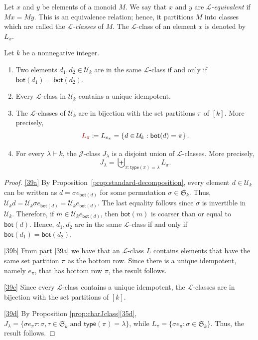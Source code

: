 \documentclass[ALCO,Unicode]{cedram}
\newcommand{\defncolor}{\color{darkred}}
\newcommand{\defn}[1]{{\defncolor\emph{#1}}} %
\begin{document}
Let $x$ and $y$ be elements of a monoid $M$.  We say that $x$ and $y$ are \defn{$\mathscr{L}$-equivalent} if $Mx = My$.
This is an equivalence relation; hence, it partitions $M$ into classes which are called the \defn{$\mathscr{L}$-classes} of $M$.
The $\mathscr{L}$-class of an element $x$ is denoted by \defn{$L_x$}.

\begin{prop} Let $k$ be a nonnegative integer.
\begin{enumerate}[label=(\alph*)]
    \item\label{39a} Two elements $d_1,d_2\in \mathcal{U}_k$ are in the same $\mathscr{L}$-class if and only if $\mathsf{bot}(d_1) = \mathsf{bot}(d_2)$.
    \item\label{39b} Every $\mathscr{L}$-class in $\mathcal{U}_k$ contains a unique idempotent.
    \item\label{39c} The $\mathscr{L}$-classes of $\mathcal{U}_k$ are in bijection with the set partitions $\pi$ of $[k]$. More precisely,
    $${\defncolor L_\pi} \coloneqq L_{e_\pi} = \left\{ d \in \mathcal{U}_k : \mathsf{bot}(d) = \pi\right\}.$$
    \item\label{39d} For every $\lambda \vdash k$, the $\mathscr{J}$-class $J_\lambda$
        is a disjoint union of $\mathscr{L}$-classes.
        More precisely, $$J_\lambda = \biguplus_{\pi: \mathsf{type}(\pi) = \lambda} L_\pi.$$
\end{enumerate}
\end{prop}

\begin{proof}
\ref{39a} By Proposition~\ref{prop:standard-decomposition}, every element $d \in \mathcal{U}_k$ can be written as
$d = \sigma e_{\mathsf{bot}(d)}$ for some permutation $\sigma \in \mathfrak{S}_k$. Thus,
$\mathcal{U}_k d = \mathcal{U}_k \sigma e_{\mathsf{bot}(d)} = \mathcal{U}_k e_{\mathsf{bot}(d)}$. The last equality follows since $\sigma$
is invertible in $\mathcal{U}_k$. Therefore, if $m \in \mathcal{U}_k e_{\mathsf{bot}(d)}$, then $\mathsf{bot}(m)$ is coarser than or equal to
$\mathsf{bot}(d)$. Hence, $d_1,d_2$ are in the same $\mathscr{L}$-class if and only if $\mathsf{bot}(d_1)= \mathsf{bot}(d_2)$.

\ref{39b} From part \ref{39a} we have that an $\mathscr{L}$-class $L$ contains elements that have the same set partition $\pi$ as the bottom row. Since there is a
unique idempotent, namely $e_\pi$, that has bottom row $\pi$, the result follows.

\ref{39c} Since every $\mathscr{L}$-class contains a unique idempotent, the $\mathscr{L}$-classes are in bijection with the set partitions of $[k]$.

\ref{39d} By Proposition \ref{prop:charJclass}\ref{35d},  $J_\lambda =\{ \sigma e_\pi \tau : \sigma, \tau \in \mathfrak{S}_k \text{ and } \mathsf{type}(\pi) = \lambda\}$, while
$L_\pi = \{\sigma e_\pi : \sigma \in \mathfrak{S}_k \}$. Thus, the result follows.
\end{proof}
\end{document}
